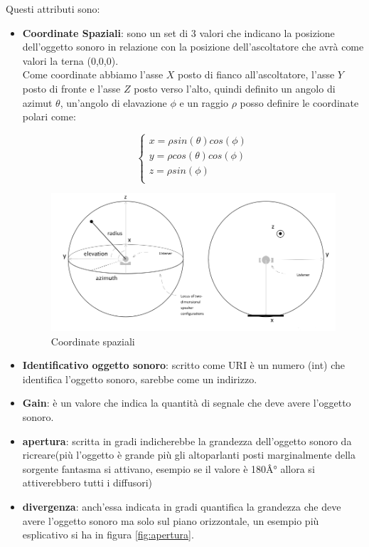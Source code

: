 \documentclass[12pt,a4paper]{report}
\begin{document}
Questi attributi sono:
\begin{itemize}\label{aaa}
\item \textbf{Coordinate Spaziali}: sono un set di 3 valori che indicano la posizione dell'oggetto sonoro in relazione con la posizione dell'ascoltatore che avrà come valori la terna (0,0,0).\\

Come coordinate abbiamo l'asse $X$ posto di fianco all'ascoltatore, l'asse $Y$ posto di fronte e l'asse $Z$ posto verso l'alto, quindi definito un angolo di azimut $\theta$, un'angolo di elavazione $\phi$ e un raggio $\rho$
posso definire le coordinate polari come:

\begin{equation}
	\left\{\begin{matrix}
x=\rho sin(\theta) cos(\phi) \\
y=\rho cos(\theta) cos(\phi)\\
z=\rho sin(\phi)\\
\end{matrix}\right.
	\label{eq:coordinatepolari}
\end{equation}

\begin{figure}[htbp]
	\centering
	\includegraphics[scale=0.35]{figures/azimut.png}
	\caption {Coordinate spaziali} 
	\label{fig:coordinate}
	\end{figure}
	
\item \textbf{Identificativo oggetto sonoro}: scritto come URI è un numero (int) che identifica l'oggetto sonoro, sarebbe come un indirizzo.
\item \textbf{Gain}: è un valore che indica la quantità di segnale che deve avere l'oggetto sonoro.
\item \textbf{apertura}: scritta in gradi indicherebbe la grandezza dell'oggetto sonoro da ricreare(più l'oggetto è grande più gli altoparlanti posti marginalmente della sorgente fantasma si attivano, esempio se il valore è 180Â° allora si attiverebbero tutti i diffusori)
\item \textbf{divergenza}: anch'essa indicata in gradi quantifica la grandezza che deve avere l'oggetto sonoro ma solo sul piano orizzontale, un esempio più esplicativo si ha in figura \ref{fig:apertura}.
	

\end{itemize}
\end{document}
